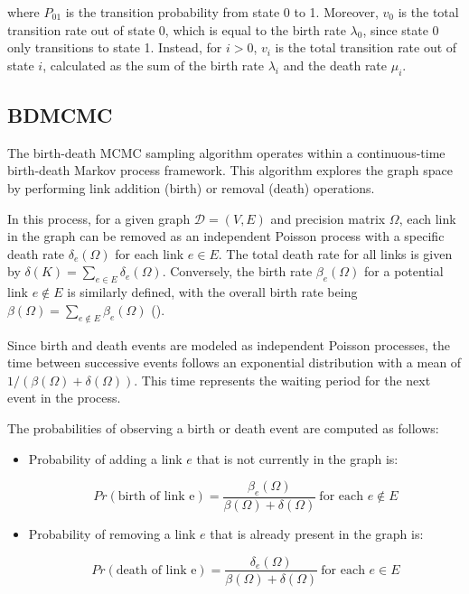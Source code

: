 \documentclass{report}
\begin{document}
where $P_{01}$ is the transition probability from state 0 to 1. Moreover, $v_0$ is the total transition rate out of state 0, which is equal to the birth rate $\lambda_0$, since state 0 only transitions to state 1. Instead, for $i>0$, $v_i$ is the total transition rate out of state $i$, calculated as the sum of the birth rate $\lambda_i$ and the death rate $\mu_i$.

\subsection{BDMCMC}

The birth-death MCMC sampling algorithm operates within a continuous-time birth-death Markov process framework. This algorithm explores the graph space by performing link addition (birth) or removal (death) operations.

In this process, for a given graph $\mathcal{D} = (V, E)$ and precision matrix $\Omega$, each link in the graph can be removed as an independent Poisson process with a specific death rate $\delta_e(\Omega)$ for each link $e \in E$. The total death rate for all links is given by $\delta(K) = \sum_{e \in E} \delta_e(\Omega)$. Conversely, the birth rate $\beta_e(\Omega)$ for a potential link $e \notin E$ is similarly defined, with the overall birth rate being $\beta(\Omega) = \sum_{e \notin E} \beta_e(\Omega)$ (\citet{mohammadi2015bdgraph}).

Since birth and death events are modeled as independent Poisson processes, the time between successive events follows an exponential distribution with a mean of $1 / (\beta(\Omega) + \delta(\Omega))$. This time represents the waiting period for the next event in the process.

The probabilities of observing a birth or death event are computed as follows: 

\begin{itemize}
	\item Probability of adding a link $e$ that is not currently in the graph is:
	
	
	\begin{equation}
		Pr(\text{birth of link e}) = \frac{\beta_e(\Omega)}{\beta(\Omega)+\delta(\Omega)}\ \text{for each $e \notin E$}
	\end{equation}
	
	\item Probability of removing a link $e$ that is already present in the graph is:
	
	\begin{equation}
		Pr(\text{death of link e}) = \frac{\delta_e(\Omega)}{\beta(\Omega)+\delta(\Omega)}\ \text{for each $e \in E$}
	\end{equation}
	
\end{itemize}
\end{document}

